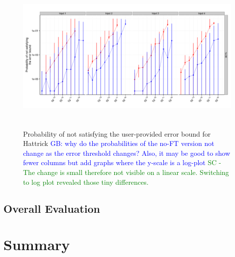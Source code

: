 \documentclass{sig-alternate}
\newcommand{\sui}[1]{%
  \textcolor{green}{SC - #1}
}
\newcommand{\greg}[1]{%
  \textcolor{blue}{GB: #1}
}
\begin{document}
\begin{figure}[ht!]
\centering
\includegraphics[height=3in]{figs/Hattrick_ImperfectRate_log.png}
\caption{Probability of not satisfying the user-provided error bound for Hattrick \greg{why do the probabilities of the no-FT version not change as the error threshold changes? Also, it may be good to show fewer columns but add graphs where the y-scale is a log-plot} \sui{The change is small therefore not visible on a linear scale. Switching to log plot revealed those tiny differences.}}
\label{fig:Hattrick_ImperfectRate}
\end{figure}

\subsection{Overall Evaluation}
\label{sec:eval:overall}


\section{Summary}
\label{sec:summary}



\end{document}
